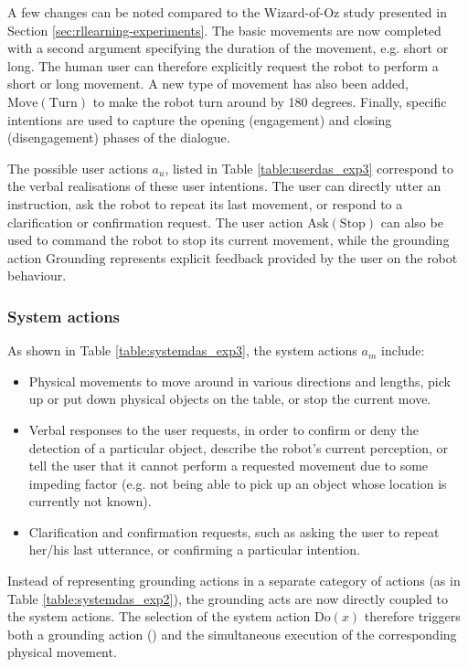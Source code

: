 A few changes can be noted compared to the Wizard-of-Oz study presented in Section \ref{sec:rllearning-experiments}. The basic movements are now completed with a second argument specifying the duration of the movement, e.g. short or long. The human user can therefore explicitly request the robot to perform a short or long movement. A new type of movement has also been added, $\mathrm{Move(Turn)}$ to make the robot turn around by 180 degrees.  Finally, specific intentions are used to capture the opening (engagement) and closing (disengagement) phases of the dialogue. 

The possible user actions $a_u$, listed in Table \ref{table:userdas_exp3} correspond to the verbal realisations of these user intentions. The user can directly utter an instruction, ask the robot to repeat its last movement, or respond to a clarification or confirmation request.   The user action $\mathrm{Ask(Stop)}$ can also be used to command the robot to stop its current movement, while the grounding action $\mathrm{Grounding}$ represents explicit  feedback provided by the user on the robot behaviour.

\subsubsection*{System actions}
As shown in Table \ref{table:systemdas_exp3}, the system actions $a_m$ include: \begin{itemize}
\item Physical movements to move around in various directions and lengths, pick up or put down physical objects on the table, or stop the current move.
\item Verbal responses to the user requests, in order to confirm or deny the detection of a particular object, describe the robot's current perception, or tell the user that it cannot perform a requested movement due to some impeding factor (e.g. not being able to pick up an object whose location is currently not known). 
\item Clarification and confirmation requests, such as asking the user to repeat her/his last utterance, or confirming a particular intention.
\end{itemize}

Instead of representing grounding actions in a separate category of actions (as in Table \ref{table:systemdas_exp2}), the grounding acts are now directly coupled to the system actions. The selection of the system action $\mathrm{Do}(x)$ therefore triggers both a grounding action () and the simultaneous execution of the corresponding physical movement. 

